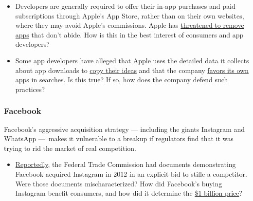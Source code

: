 \begin{itemize}
\tightlist
\item
  Developers are generally required to offer their in-app purchases and
  paid subscriptions through Apple's App Store, rather than on their own
  websites, where they may avoid Apple's commissions. Apple has
  \href{https://www.nytimes3xbfgragh.onion/2020/06/19/opinion/apple-app-store-hey.html}{threatened
  to remove apps} that don't abide. How is this in the best interest of
  consumers and app developers?
\end{itemize}

\begin{itemize}
\tightlist
\item
  Some app developers have alleged that Apple uses the detailed data it
  collects about app downloads to
  \href{https://appleinsider.com/articles/19/06/06/developers-talk-about-being-sherlocked-as-apple-uses-them-for-market-research}{copy
  their ideas} and that the company
  \href{https://www.nytimes3xbfgragh.onion/interactive/2019/09/09/technology/apple-app-store-competition.html}{favors
  its own apps} in searches. Is this true? If so, how does the company
  defend such practices?
\end{itemize}

\hypertarget{facebook}{%
\subsubsection{Facebook}\label{facebook}}

Facebook's aggressive acquisition strategy --- including the giants
Instagram and WhatsApp ---~makes it vulnerable to a breakup if
regulators find that it was trying to rid the market of real
competition.

\begin{itemize}
\tightlist
\item
  \href{https://nypost.com/2019/02/26/facebook-boasted-of-buying-instagram-to-kill-the-competition-sources/}{Reportedly},
  the Federal Trade Commission had documents demonstrating Facebook
  acquired Instagram in 2012 in an explicit bid to stifle a competitor.
  Were those documents mischaracterized? How did Facebook's buying
  Instagram benefit consumers, and how did it determine the
  \href{https://dealbook.nytimes3xbfgragh.onion/2012/04/09/facebook-buys-instagram-for-1-billion/}{\$1
  billion price}?
\end{itemize}

